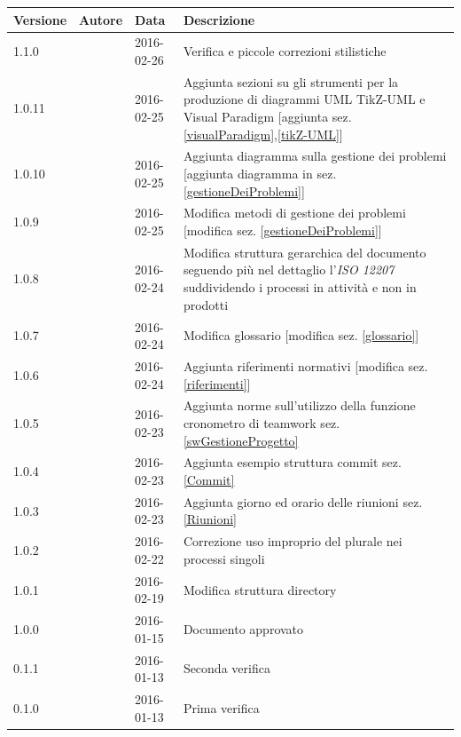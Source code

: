 \documentclass[12pt,a4paper]{article}
\begin{document}
\begin{center}
	\begin{longtable}[H]{p{} p{} p{} p{}}
		\toprule
		\textbf{Versione}	&	\textbf{Autore}	&	\textbf{Data}	&	\textbf{Descrizione}\\*
		\midrule
		\midrule
		1.1.0 & \AVI{} & 2016-02-26 & Verifica e piccole correzioni stilistiche \\*
		\midrule
		1.0.11 & \TP{} & 2016-02-25 & Aggiunta sezioni su gli strumenti per la produzione di diagrammi UML TikZ-UML e Visual Paradigm [aggiunta sez. \ref{visualParadigm},\ref{tikZ-UML}]\\*
		\midrule
		1.0.10 & \TP{} & 2016-02-25 & Aggiunta diagramma sulla gestione dei problemi [aggiunta diagramma in sez. \ref{gestioneDeiProblemi}] \\*
		\midrule
		1.0.9 & \TP{} & 2016-02-25 & Modifica metodi di gestione dei problemi [modifica sez. \ref{gestioneDeiProblemi}]  \\*
		\midrule
		1.0.8 & \TP{} & 2016-02-24 & Modifica struttura gerarchica del documento seguendo più nel dettaglio l'\textit{ISO 12207} suddividendo i processi in attività e non in prodotti \\*
		\midrule
		1.0.7 & \TP{} & 2016-02-24 & Modifica glossario [modifica sez. \ref{glossario}] \\*
		\midrule
		1.0.6 & \TP{} & 2016-02-24 & Aggiunta riferimenti normativi [modifica sez. \ref{riferimenti}] \\*
		\midrule
		1.0.5 & \TP & 2016-02-23 & Aggiunta norme sull'utilizzo della funzione cronometro di teamwork sez. \ref{swGestioneProgetto}\\*
		\midrule
		1.0.4 & \TP & 2016-02-23 & Aggiunta esempio struttura commit sez. \ref{Commit}\\*
		\midrule
		1.0.3 & \TP & 2016-02-23 & Aggiunta giorno ed orario delle riunioni sez. \ref{Riunioni}\\*
		\midrule
		1.0.2 & \TP & 2016-02-22 & Correzione uso improprio del plurale nei processi singoli \\*
		\midrule
		1.0.1 & \TP & 2016-02-19 & Modifica struttura directory \\*
		\midrule
		1.0.0 & \IB & 2016-01-15 & Documento approvato \\*
		\midrule
		0.1.1 & \TP & 2016-01-13 & Seconda verifica \\*
		\midrule
		0.1.0 & \WS & 2016-01-13 & Prima verifica \\*
		\midrule

\end{longtable}
\end{center}
\end{document}
